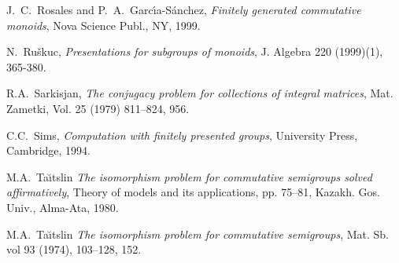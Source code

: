 \documentclass{acmconf}
\begin{document}
\begin{thebibliography}{9}
   J.~C.~Rosales and  P.~A.~Garc\'{\i}a-S\'{a}nchez,
  \emph{Finitely generated commutative monoids}, Nova Science Publ., NY, 1999.

N.~Ru\v{s}kuc,
{\it Presentations for subgroups of monoids},
J. Algebra 220 (1999)(1), 365-380.

R.A.~Sarkisjan,  
\emph{The conjugacy problem for collections of integral matrices},
Mat. Zametki, Vol. 25 (1979) 811--824, 956. 

 C.C.~Sims,
 \emph{Computation with finitely presented groups},
 University Press, Cambridge, 1994.

 M.A.~Ta\u{\i}tslin
 \emph{The isomorphism problem for commutative semigroups solved
affirmatively},
  Theory of models and its applications, pp. 75--81, 
  Kazakh. Gos. Univ., Alma-Ata, 1980. 

  M.A.~Ta\u{\i}tslin
  \emph{The isomorphism problem for commutative semigroups},
  Mat. Sb. vol 93 (1974), 103--128, 152. 



 
\end{thebibliography}
\end{document}

